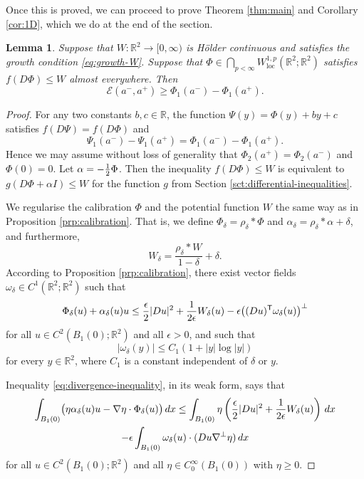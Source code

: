 \documentclass[a4paper]{article}
\newcommand{\R}{\mathbb{R}}
\newcommand{\loc}{\mathrm{loc}}
\newcommand{\transpose}{\mathsf{T}}
\let\div\relax\DeclareMathOperator{\div}{div}
\newtheorem{lemma}[theorem]{Lemma}
\theoremstyle{definition}
\theoremstyle{remark}
\begin{document}
Once this is proved, we can proceed to prove Theorem \ref{thm:main} and Corollary \ref{cor:1D}, which we do at the end of the section.

\begin{lemma} \label{lem:calibration-implies-inequality}
Suppose that $W \colon \R^2 \to [0, \infty)$ is H\"older continuous and satisfies the growth condition \eqref{eq:growth-W}.
Suppose that $\Phi \in \bigcap_{p < \infty} W_\loc^{1, p}(\R^2; \R^2)$
satisfies $f(D\Phi) \le W$ almost everywhere. Then
\[
\mathcal{E}(a^-, a^+) \ge \Phi_1(a^-) - \Phi_1(a^+).
\]
\end{lemma}

\begin{proof}
For any two constants $b, c \in \R$, the function $\Psi(y) = \Phi(y) + by + c$ satisfies
$f(D\Psi) = f(D\Phi)$ and
\[
\Psi_1(a^-) - \Psi_1(a^+) = \Phi_1(a^-) - \Phi_1(a^+).
\]
Hence we may assume without loss of generality that $\Phi_2(a^+) = \Phi_2(a^-)$ and $\Phi(0) = 0$.
Let $\alpha = - \frac{1}{2} \div \Phi$. Then the inequality $f(D\Phi) \le W$
is equivalent to $g(D\Phi + \alpha I) \le W$ for the function $g$ from Section \ref{sct:differential-inequalities}.

We regularise the calibration $\Phi$ and the potential function $W$ the
same way as in Proposition \ref{prp:calibration}. That is, we define $\Phi_\delta = \rho_\delta * \Phi$ and
$\alpha_\delta = \rho_\delta * \alpha + \delta$, and furthermore,
\[
W_\delta = \frac{\rho_\delta * W}{1 - \delta} + \delta.
\]
According to Proposition \ref{prp:calibration}, there exist vector fields
$\omega_\delta \in C^1(\R^2; \R^2)$ such that
\begin{equation} \label{eq:divergence-inequality}
\div \Phi_\delta(u)  + \alpha_\delta(u) \div u \le \frac{\epsilon}{2} |Du|^2 + \frac{1}{2\epsilon} W_\delta(u) - \epsilon \div \bigl((Du)^\transpose \omega_\delta(u)\bigr)^\perp
\end{equation}
for all $u \in C^2(B_1(0); \R^2)$ and all $\epsilon > 0$, and such that
\[
|\omega_\delta(y)| \le C_1(1 + |y| \log |y|)
\]
for every $y \in \R^2$, where $C_1$ is a constant independent of $\delta$
or $y$.

Inequality \eqref{eq:divergence-inequality}, in its weak form, says that
\begin{multline} \label{eq:divergence-inequality-weak}
\int_{B_1(0)} \bigl(\eta \alpha_\delta(u) \div u - \nabla \eta \cdot \Phi_\delta(u)\bigr) \, dx \le \int_{B_1(0)} \eta \left(\frac{\epsilon}{2} |Du|^2 + \frac{1}{2\epsilon} W_\delta(u)\right) \, dx \\
- \epsilon \int_{B_1(0)} \omega_\delta(u) \cdot (Du \nabla^\perp \eta) \, dx
\end{multline}
for all $u \in C^2(B_1(0); \R^2)$ and all $\eta \in C_0^\infty(B_1(0))$
with $\eta \ge 0$.


\end{proof}
\end{document}
